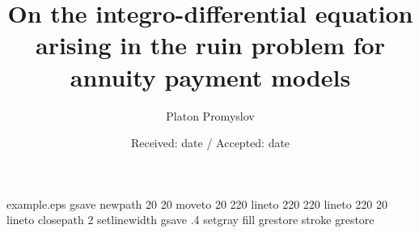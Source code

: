 \begin{filecontents*}{example.eps}
gsave
newpath
  20 20 moveto
  20 220 lineto
  220 220 lineto
  220 20 lineto
closepath
2 setlinewidth
gsave
  .4 setgray fill
grestore
stroke
grestore
\end{filecontents*}
%
\RequirePackage{fix-cm}

\documentclass[smallextended]{svjour3}    
\smartqed  %
%
\usepackage{graphicx}
\usepackage{amscd,amsfonts,amssymb,amsmath,latexsym,array,hhline,xcolor,graphicx}

\usepackage{latexsym}
\usepackage{times}
\def\hbr{\hfil\break}
\newcommand\F{\mbox{I\kern-2pt F}}
\newcommand\cA{{\cal A}}
\newcommand\cE{{\cal E}}
\newcommand\cC{{\cal C}}
\newcommand\cF{{\cal F}}
\newcommand\cG{{\cal G}}
\newcommand\cK{{\cal K}}
\newcommand\cL{{\cal L}}
\newcommand\cB{{\cal B}}
\newcommand\cN{{\cal N}}
\newcommand\cM{{\cal M}}
\newcommand\cX{{\cal X}}
\newcommand\cD{{\cal D}}
\newcommand\cR{{\cal R}}
\newcommand\cP{{\cal P}}
\newcommand\cQ{{\cal Q}}
\newcommand\cS{{\cal S}}
\newcommand\cV{{\cal V}}
\newcommand\cZ{{\cal Z}}
\newcommand\e{{\varepsilon}}
\newcommand{\wt}{\widetilde}
\def\D{{\bf D}}
\def\E{{\bf E}}
\def\P{{\bf P}}
\def\Chi{{\bf 1}}
\def\a{{\bf a}}
\def\L{{\bf L}}

\def\bbr{{\mathbb R}}
\newcommand\oo{\mbox{o}}
\newcommand\fdem{$\Box$}
\newcommand\beq{\begin{equation}}
\newcommand\eeq{\end{equation}}
\newcommand\bea{\begin{eqnarray}}
\newcommand\eea{\end{eqnarray}}
\newcommand\bean{\begin{eqnarray*}}
\newcommand\eean{\end{eqnarray*}}



\title{On the integro-differential equation arising in the ruin problem for annuity payment models}
\author{Platon Promyslov} 


\date{Received: date / Accepted: date}


\maketitle
 
